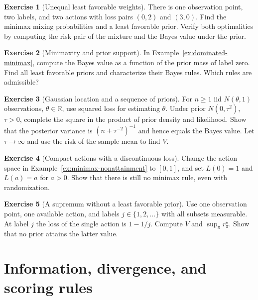 \documentclass[11pt,oneside]{book}
\theoremstyle{definition}
\newtheorem{exercise}{Exercise}[section]
\theoremstyle{remark}
\newcommand{\R}{\mathbb R}
\begin{document}
\begin{exercise}[Unequal least favorable weights]
\label{exer:unequal-least-favorable}
There is one observation point, two labels, and two actions with
loss pairs $(0,2)$ and $(3,0)$. Find the minimax mixing probabilities
and a least favorable prior. Verify both optimalities by computing
the risk pair of the mixture and the Bayes value under the prior.
\end{exercise}

\begin{exercise}[Minimaxity and prior support]
\label{exer:minimax-prior-support}
In Example~\ref{ex:dominated-minimax}, compute the Bayes value as a
function of the prior mass of label zero. Find all least favorable
priors and characterize their Bayes rules. Which rules are admissible?
\end{exercise}

\begin{exercise}[Gaussian location and a sequence of priors]
\label{exer:normal-minimax-priors}
For $n\geq1$ iid $N(\theta,1)$ observations, $\theta\in\R$, use
squared loss for estimating $\theta$. Under prior $N(0,\tau^2)$,
$\tau>0$, complete the square in the product of prior density and
likelihood. Show that the posterior variance is
$(n+\tau^{-2})^{-1}$ and hence equals the Bayes value.
Let $\tau\to\infty$ and use the risk of the sample mean to find $V$.
\end{exercise}

\begin{exercise}[Compact actions with a discontinuous loss]
\label{exer:compact-actions-nonattainment}
Change the action space in Example~\ref{ex:minimax-nonattainment}
to $[0,1]$, and set $L(0)=1$ and $L(a)=a$ for $a>0$.
Show that there is still no minimax rule, even with randomization.
\end{exercise}

\begin{exercise}[A supremum without a least favorable prior]
\label{exer:least-favorable-nonattainment}
Use one observation point, one available action, and labels
$j\in\{1,2,\ldots\}$ with all subsets measurable. At label $j$ the
loss of the single action is $1-1/j$. Compute $V$ and
$\sup_\pi r_\pi^\star$. Show that no prior attains the latter value.
\end{exercise}

\chapter{Information, divergence, and scoring rules}
\label{chap:information-scoring}
\end{document}
